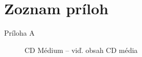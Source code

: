 
\chapter*{Zoznam príloh}

\begin{description}
    \item[Príloha A] CD Médium -- viď. obsah CD média 
\end{description}

